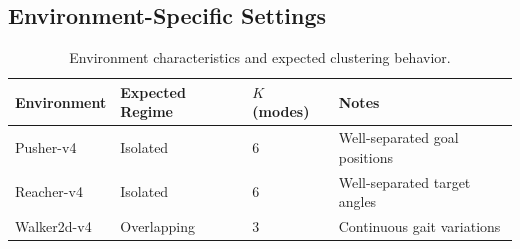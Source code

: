 \documentclass[11pt,a4paper]{article}
\begin{document}
\subsection{Environment-Specific Settings}

\begin{table}[h]
\centering
\begin{tabular}{@{}llll@{}}
\toprule
\textbf{Environment} & \textbf{Expected Regime} & \textbf{$K$ (modes)} & \textbf{Notes} \\
\midrule
Pusher-v4 & Isolated & 6 & Well-separated goal positions \\
Reacher-v4 & Isolated & 6 & Well-separated target angles \\
Walker2d-v4 & Overlapping & 3 & Continuous gait variations \\
\bottomrule
\end{tabular}
\caption{Environment characteristics and expected clustering behavior.}
\end{table}
\end{document}
